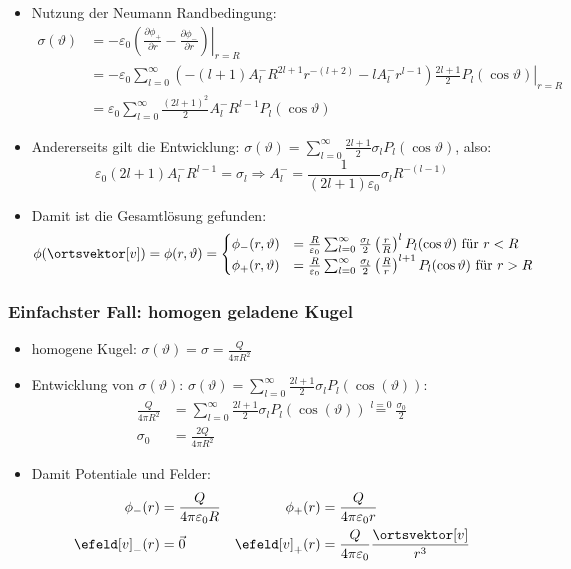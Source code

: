 \begin{frame}
  \begin{itemize}[<+->]
  \item Nutzung der Neumann Randbedingung:
    \begin{align*}
      \sigma(\vartheta) &= -\varepsilon_0 \left.\left( \frac{\partial \phi_+}{\partial r} - \frac{\partial \phi_-}{\partial r}\right)\right|_{r=R} \\
                     & = \left. -\varepsilon_0 \sum_{l=0}^{\infty} \left( -(l+1) A_{l}^- R^{2l+1} r^{-(l+2)}- l A_{l}^- r^{l-1}\right) \frac{2l+1}{2} P_l (\cos\vartheta) \right|_{r=R} \\
      &= \varepsilon_0 \sum_{l=0}^{\infty} \frac{(2l+1)^2}{2} A_{l}^- R^{l-1} P_l (\cos\vartheta) 
    \end{align*}
  \item Andererseits gilt die Entwicklung: $\sigma(\vartheta) = \sum_{l=0}^{\infty}  \frac{2l+1}{2} \sigma_l P_l (\cos\vartheta)$, also:
    $$
    \varepsilon_0 (2l+1) A_{l}^- R^{l-1} = \sigma_l \Rightarrow \boxed{ A_{l}^- = \frac{1}{(2l+1)\varepsilon_0}\sigma_l  R^{-(l-1)}}
    $$
  \item Damit ist die Gesamtlösung gefunden:
    $$
    \phi(\ortsvektor[v]) = \phi(r,\vartheta) =
    \begin{cases}
      \phi_-(r,\vartheta) & = \frac{R}{\varepsilon_0} \sum_{l=0}^{\infty} \frac{\sigma_l}{2} \left(\frac{r}{R}\right)^l P_l(\cos\vartheta) \text{ für } r<R\\ 
      \phi_+(r,\vartheta) & = \frac{R}{\varepsilon_0} \sum_{l=0}^{\infty} \frac{\sigma_l}{2} \left(\frac{R}{r}\right)^{l+1} P_l(\cos\vartheta) \text{ für } r>R\\ 
      \end{cases}
    $$
    \end{itemize}
  \end{frame}

 \begin{frame}
   \frametitle{Einfachster Fall: homogen geladene Kugel}
   \begin{itemize}[<+->]
   \item homogene Kugel: $\sigma(\vartheta) = \sigma = \frac{Q}{4\pi R^2}$
   \item Entwicklung von $\sigma(\vartheta)$: $\sigma(\vartheta) = \sum_{l=0}^\infty \frac{2l+1}{2}\sigma_l P_l(\cos(\vartheta))$:
     \begin{align*}
       \frac{Q}{4\pi R^2} & = \sum_{l=0}^\infty \frac{2l+1}{2}\sigma_l P_l(\cos(\vartheta)) \stackrel{l=0}{=} \frac{\sigma_0}{2}\\
       \sigma_0 &= \frac{2Q}{4\pi R^2}
     \end{align*}
   \item Damit Potentiale und Felder:
     \begin{align*}
       \phi_-(r) & = \frac{Q}{4\pi\varepsilon_0 R} & \phi_+(r) & = \frac{Q}{4\pi\varepsilon_0 r}\\
       \efeld[v]_- (r) &= \vec{0} & \efeld[v]_+ (r) &= \frac{Q}{4\pi\varepsilon_0} \frac{\ortsvektor[v]}{r^3} 
       \end{align*}
     \end{itemize}
\end{frame}  


   
